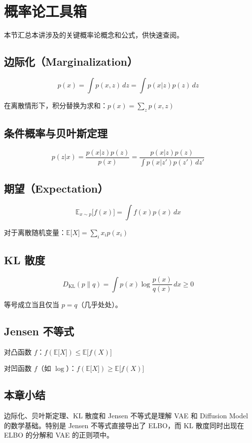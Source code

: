 \section{概率论工具箱}

本节汇总本讲涉及的关键概率论概念和公式，供快速查阅。

\subsection{边际化（Marginalization）}

$$p(x) = \int p(x, z) \, dz = \int p(x|z) p(z) \, dz$$

在离散情形下，积分替换为求和：$p(x) = \sum_z p(x, z)$

\subsection{条件概率与贝叶斯定理}

$$p(z|x) = \frac{p(x|z) p(z)}{p(x)} = \frac{p(x|z) p(z)}{\int p(x|z') p(z') \, dz'}$$

\subsection{期望（Expectation）}

$$\mathbb{E}_{x \sim p}{[}f(x){]} = \int f(x) p(x) \, dx$$

对于离散随机变量：$\mathbb{E}{[}X{]} = \sum_i x_i p(x_i)$

\subsection{KL 散度}

$$D_{\mathrm{KL}}(p \| q) = \int p(x) \log \frac{p(x)}{q(x)} \, dx \geq 0$$

等号成立当且仅当 $p = q$（几乎处处）。

\subsection{Jensen 不等式}

对凸函数 $f$：$f(\mathbb{E}{[}X{]}) \leq \mathbb{E}{[}f(X){]}$

对凹函数 $f$（如 $\log$）：$f(\mathbb{E}{[}X{]}) \geq \mathbb{E}{[}f(X){]}$

\subsection{本章小结}

边际化、贝叶斯定理、KL 散度和 Jensen 不等式是理解 VAE 和 Diffusion Model 的数学基础。特别是 Jensen 不等式直接导出了 ELBO，而 KL 散度同时出现在 ELBO 的分解和 VAE 的正则项中。

\newpage
